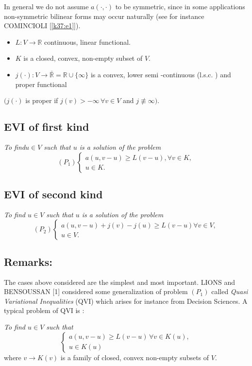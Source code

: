 In general we do not assume $a(\cdot , \cdot)$ to be symmetric, since in some
applications non-symmetric bilinear forms may occur naturally (see for
instance COMINCIOLI [\ref{k37:e1}]).  
\begin{itemize}
\item $L : V \to \mathbb{R}$ continuous, linear functional. 
\item $K$ is a closed, convex, non-empty subset of $V$.
\item $j(\cdot) : V \to \bar{\mathbb{R}} = \mathbb{R} \cup \{\infty\}$
  is a convex, lower semi -continuous (l.s.c. ) and proper functional  
\end{itemize}
$(j(\cdot)$ is proper if $j(v) > -\infty\,  \forall v \in V$ and $j \not \equiv \infty)$.

\subsection{EVI of first kind}\label{c1:ss2.2}

\textit{To find\pageoriginale $u \in V$ such that $u$ is a solution of the
  problem} 
\begin{equation*}
(P_1)\begin{cases}
a(u, v - u) \geq L(v - u), \forall v \in K,\\
u \in K.
\end{cases}
\end{equation*}

\subsection{EVI of second kind}\label{c1:ss2.3}

\textit{To find $u \in V$ such that $u$ is a solution of the problem}
\begin{equation*}
(P_2)
\begin{cases}
  a(u, v - u) + j(v) - j(u) \geq L(v - u)  \forall v \in V,\\
  u \in V.
\end{cases}
\end{equation*}

\subsection{Remarks:}\label{c1:ss2.4}
 
\begin{remark}\label{c1:rem2.1}
The cases above considered are the simplest and most important. LIONS
and BENSOUSSAN [1] considered some generalization of problem $(P_1)$
called {\em Quasi Variational Inequalities} (QVI) which arises for
instance from Decision Sciences. A typical problem of QVI is : 

{\em To find $u \in V$ such that}
\begin{equation*}
\begin{cases}
a(u, v - u) \geq L(v - u)\, \forall v \in K(u),\\
u \in K(u)
\end{cases}
\end{equation*}
where $v \to K(v)$ is a family of closed, convex non-empty subsets of $V$.
\end{remark}


